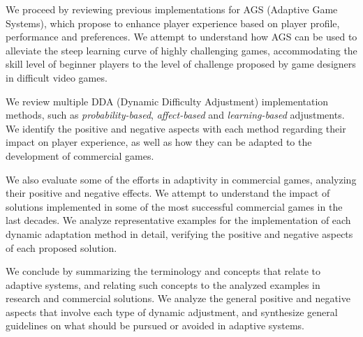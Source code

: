 We proceed by reviewing previous implementations for AGS (Adaptive Game Systems), which propose to enhance player experience based on player profile, performance and preferences. We attempt to understand how AGS can be used to alleviate the steep learning curve of highly challenging games, accommodating the skill level of beginner players to the level of challenge proposed by game designers in difficult video games.

We review multiple DDA (Dynamic Difficulty Adjustment) implementation methods, such as \emph{probability-based}, \emph{affect-based} and \emph{learning-based} adjustments. We identify the positive and negative aspects with each method regarding their impact on player experience, as well as how they can be adapted to the development of commercial games.

We also evaluate some of the efforts in adaptivity in commercial games, analyzing their positive and negative effects. We attempt to understand the impact of solutions implemented in some of the most successful commercial games in the last decades. We analyze representative examples for the implementation of each dynamic adaptation method in detail, verifying the positive and negative aspects of each proposed solution.

We conclude by summarizing the terminology and concepts that relate to adaptive systems, and relating such concepts to the analyzed examples in research and commercial solutions.  We analyze the general positive and negative aspects that involve each type of dynamic adjustment, and synthesize general guidelines on what should be pursued or avoided in adaptive systems.

